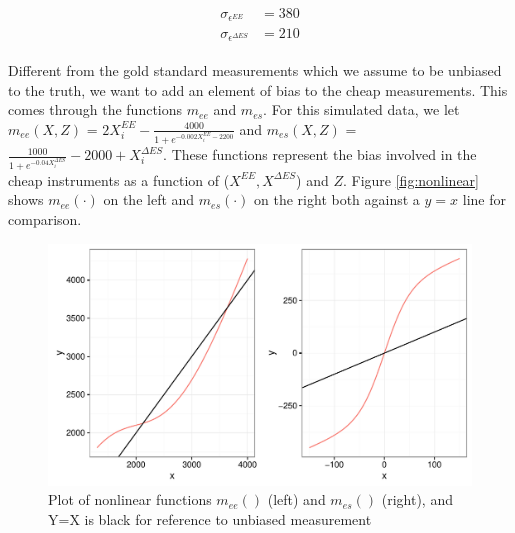 \documentclass[11pt]{article}\usepackage[]{graphicx}\usepackage[]{color}
\makeatletter
\def\maxwidth{ %
  \ifdim\Gin@nat@width>\linewidth
    \linewidth
  \else
    \Gin@nat@width
  \fi
}
\newenvironment{knitrout}{}{} %
\makeatother
\begin{document}
  
\begin{align}
  \begin{split}
   \label{cheapvar}
   \sigma_{\epsilon^{EE}} &= 380 \\
   \sigma_{\epsilon^{\Delta ES}} &= 210
   \end{split}
\end{align}

  Different from the gold standard measurements which we assume to be unbiased to the truth, we want to add an element of bias to the cheap measurements. This comes through the functions $m_{ee}$ and $m_{es}$. For this simulated data, we let $m_{ee}(X,Z)$ = $2X_i^{EE}-\frac{4000}{1+e^{-0.002X_i^{EE}-2200}} $ and $m_{es}(X,Z)$ = $\frac{1000}{1+e^{-0.04X_i^{\Delta ES}}} - 2000 + X_i^{\Delta ES}$. These functions represent the bias involved in the cheap instruments as a function of ($X^{EE},X^{\Delta ES}$) and $Z$. Figure \eqref{fig:nonlinear} shows $m_{ee}(\cdot)$ on the left and $m_{es}(\cdot)$ on the right both against a  $y=x$ line for comparison. 


\begin{knitrout}
\color{fgcolor}\begin{figure}

{\centering \includegraphics[width=\maxwidth]{figure/nonlinear-1} 

}

\caption[Plot of nonlinear functions ]{Plot of nonlinear functions $m_{ee}()$ (left) and $m_{es}()$ (right), and Y=X is black for reference to unbiased measurement}\label{fig:nonlinear}
\end{figure}


\end{knitrout}


\end{document}
